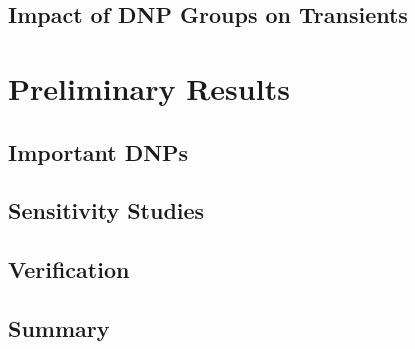 

\section{Impact of DNP Groups on Transients}
\label{sec:transimpact}


\chapter{Preliminary Results}
\label{sec:prelim-results}

\section{Important DNPs}
\label{sec:important-dnp}

\section{Sensitivity Studies}
\label{sec:sens-studies}

\section{Verification}
\label{sec:verification}

\section{Summary}
\label{sec:resultssummary}





%
%
%
%


